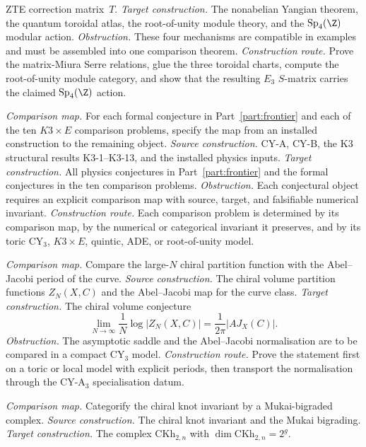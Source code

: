 \begin{description}[leftmargin=2.7em,style=nextline,topsep=0.3ex,itemsep=0.6ex]
 ZTE correction matrix~$T$.
 \emph{Target construction.}
 The nonabelian Yangian theorem, the quantum toroidal atlas,
 the root-of-unity module theory, and the $\Sp_4(\Z)$
 modular action.
 \emph{Obstruction.}
 These four mechanisms are compatible in examples and must be
 assembled into one comparison theorem.
 \emph{Construction route.}
 Prove the matrix-Miura Serre relations, glue the three
 toroidal charts, compute the root-of-unity module category,
 and show that the resulting $E_3$ $S$-matrix carries the
 claimed $\Sp_4(\Z)$ action.
\item[\textbf{CM--FR. Formal comparison problems.}]
 \emph{Comparison map.}
For each formal conjecture in Part~\ref{part:frontier} and
each of the ten \(K3\times E\) comparison problems,
specify the map from an installed construction to the
remaining object.
 \emph{Source construction.}
 CY-A, CY-B, the K3 structural results K3-1--K3-13, and the
 installed physics inputs.
 \emph{Target construction.}
 All physics conjectures in Part~\ref{part:frontier} and the
 formal conjectures in the ten comparison problems.
 \emph{Obstruction.}
Each conjectural object requires an explicit
comparison map with source, target, and falsifiable numerical
invariant.
\emph{Construction route.}
Each comparison problem is determined by its comparison map, by the numerical or
categorical invariant it preserves, and by its toric CY$_3$,
$K3\times E$, quintic, ADE, or root-of-unity model.
 \item[\textbf{CM--CV. Chiral volume.}]
 \emph{Comparison map.}
 Compare the large-$N$ chiral partition function with the
 Abel--Jacobi period of the curve.
 \emph{Source construction.}
 The chiral volume partition functions $Z_N(X,C)$ and the
 Abel--Jacobi map for the curve class.
 \emph{Target construction.}
 The chiral volume conjecture
 \[
 \lim_{N \to \infty} \frac{1}{N}\log|Z_N(X,C)|
 =
 \frac{1}{2\pi}|AJ_X(C)|.
 \]
 \emph{Obstruction.}
 The asymptotic saddle and the Abel--Jacobi normalisation are
 to be compared in a compact CY$_3$ model.
 \emph{Construction route.}
 Prove the statement first on a toric or local model with
 explicit periods, then transport the normalisation through
 the CY-A$_3$ specialisation datum.
 \item[\textbf{CM--Kh. Chiral Khovanov categorification.}]
 \emph{Comparison map.}
 Categorify the chiral knot invariant by a Mukai-bigraded
 complex.
 \emph{Source construction.}
 The chiral knot invariant and the Mukai bigrading.
 \emph{Target construction.}
 The complex $\mathrm{CKh}_{2,n}$ with
 $\dim \mathrm{CKh}_{2,n}=2^g$.

\end{description}
